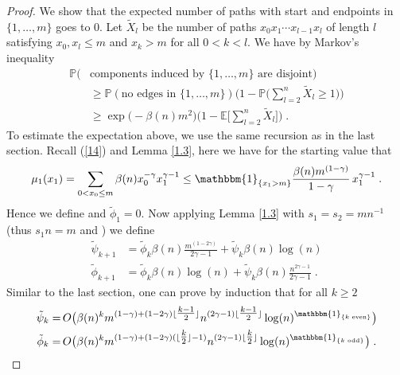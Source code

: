 \documentclass[12pt,a4paper]{article}
\numberwithin{equation}{section}
\begin{document}
\begin{proof}
We show that the expected number of paths with start and endpoints in $\{1,\ldots,m\}$ goes to 0. Let $\tilde X_l$ be the number of paths $x_0x_1\cdots x_{l-1}x_l$ of length $l$ satisfying $x_0,x_l\le m$ and $x_k>m$ for all $0<k<l$. We have by Markov's inequality 
\begin{align*}
    \mathbb P ( & \text{components induced by }\{1,\ldots,m\}\text{ are disjoint}) \\ & \ge \mathbb P (\text{no edges in }\{1,\ldots,m\}) \big(1 -  \mathbb P\big (\sum_{l=2}^n \tilde X_l \ge 1\big)\big) \\  &  \ge \exp \big( - \beta(n)m^{2}\big) \Big(1- \mathbb{E}\Big[\sum_{l=2}^n \tilde X_l\Big]\Big)\;.
\end{align*}
To estimate the expectation above, we use the same recursion as in the last section. Recall (\ref{14}) and Lemma \ref{1.3}, here we have for the starting value that
\begin{align*}
    \mu_1(x_1) = \sum_{0<x_0 \le m} \beta(n) x_0^{-\gamma} x_1^{\gamma-1} \le \mathbbm{1}_{\{x_1 > m\}}\frac{\beta(n) m^{(1-\gamma)}}{1-\gamma}\, x_{1}^{\gamma-1} \;.
\end{align*}
Hence we define  and $\tilde \phi_1=0$. Now applying Lemma \ref{1.3} with $s_1= s_2 = m n^{-1}$ (thus $s_1n=m$ and ) we define 
\begin{equation}\label{rec}
    \begin{aligned}
		\tilde \psi_{k+1}&=\tilde \phi_k \beta(n) \frac{m^{(1-2\gamma)}}{2\gamma-1}+\tilde \psi_k \beta(n) \log(n)
		\\ \tilde \phi_{k+1}&=\tilde \phi_k \beta(n) \log(n)+\tilde \psi_k \beta(n) \frac{n^{2 \gamma -1}}{2\gamma-1} \;.
\end{aligned}
\end{equation}
Similar to the last section, one can prove by induction that for all $k\ge 2$
\begin{equation} \label{esti1}
    \begin{aligned}
      \tilde \psi_{k} = &\,O\big(\beta(n)^{k}m^{(1-\gamma)+(1-2\gamma)\lfloor \tfrac{k-1}2 \rfloor}n^{(2\gamma-1)\lfloor \tfrac{k-1}2 \rfloor}\log(n)^{\mathbbm{1}_{\{k \text{ even}\}}}\big) \\
    \tilde \phi_{k} = &\,O\big(\beta(n)^{k}m^{(1-\gamma)+(1-2\gamma)(\lfloor \tfrac{k}2 \rfloor-1)}n^{(2\gamma-1)\lfloor \tfrac{k}2 \rfloor}\log(n)^{\mathbbm{1}_{\{k \text{ odd}\}}}\big)\;.

\end{aligned}
\end{equation}
\end{proof}
\end{document}
